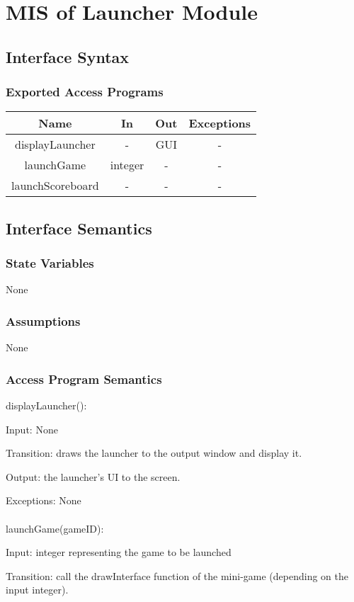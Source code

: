 \documentclass[12pt, titlepage]{article}
\begin{document}
\section{MIS of Launcher Module}
		\subsection{Interface Syntax}
		\subsubsection{Exported Access Programs}
		\begin{tabular}[pos]{|c|c|c|c|}
			\hline
			\textbf{Name}& \textbf{In} & \textbf{Out} & \textbf{Exceptions} \\ \hline
			displayLauncher & - & GUI & - \\ \hline
			launchGame & integer & - & - \\ \hline
			launchScoreboard & - & - & - \\ \hline
		\end{tabular}
		\subsection{Interface Semantics}
		\subsubsection{State Variables}
		None
		\subsubsection{Assumptions}
		None
		\subsubsection{Access Program Semantics}
		
		displayLauncher():
		
		Input: None
		
		Transition: draws the launcher to the output window and display it.
		
		Output: the launcher's UI to the screen.
		
		Exceptions: None\\
		\\
		launchGame(gameID):
		
		Input: integer representing the game to be launched
		
		Transition: call the drawInterface function of the mini-game (depending on the input integer).
		
\end{document}
